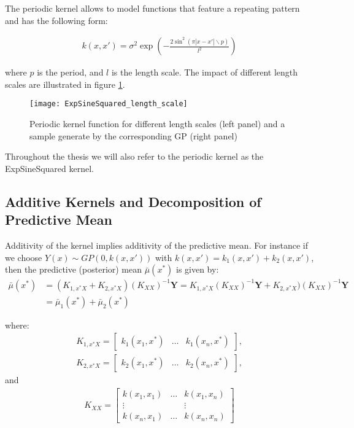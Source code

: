 The periodic kernel allows to model functions that feature a repeating pattern
and has the following form:

\begin{gather*}
k(x, x') = \sigma^2 \exp(- \frac{2 \sin^2(\pi |x-x'| \backslash p)}{l^2})
\end{gather*}

where $p$ is the period, and $l$ is the length scale.
The impact of different length scales are illustrated in figure \ref{fig:periodic}.

\begin{figure}[!hbt]%
  \centering
  \texttt{[image: ExpSineSquared\_length\_scale]} %
  \caption[Periodic Kernel: Kernel function wiht sample path]%
   {Periodic kernel function for different length scales (left panel) and a sample
    generate by the corresponding GP (right panel)}
  \label{fig:periodic}
\end{figure}

Throughout the thesis we will also refer to the periodic kernel as the
ExpSineSquared kernel.


\subsection{Additive Kernels and Decomposition of Predictive Mean}

Additivity of the kernel implies additivity of the predictive mean.
For instance if we choose $Y(x) \sim GP(0, k(x,x'))$ with $k(x,x') = k_1(x, x') + k_2(x,x')$, then
the predictive (posterior) mean $\bar{\mu}(x^{\ast})$
is given by:
\begin{align*}
    \bar{\mu}(x^{\ast}) &= (K_{1, x^{\ast}X} + K_{2, x^{\ast}X}) (K_{XX})^{-1} \mathbf{Y}
    = K_{1, x^{\ast}X} (K_{XX})^{-1} \mathbf{Y} + K_{2, x^{\ast}X}) (K_{XX})^{-1} \mathbf{Y} \\
    &= \bar{\mu}_1(x^{\ast}) + \bar{\mu}_2(x^{\ast})
\end{align*}

where:
\begin{gather*}
    K_{1, x^{\ast}X} =
    \begin{bmatrix}
        k_1(x_1, x^{\ast}) & \dots & k_1(x_n,  x^{\ast})
    \end{bmatrix}, \\
    K_{2, x^{\ast}X} =
    \begin{bmatrix}
        k_2(x_1, x^{\ast}) & \dots & k_2(x_n,  x^{\ast})
    \end{bmatrix},
\end{gather*}
and
\begin{gather*}
        K_{XX} =
    \begin{bmatrix}
        k(x_1, x_1) & \dots & k(x_1, x_n)\\
        \vdots  &  & \vdots \\
        k(x_n, x_1) & \dots  & k(x_n, x_n)
    \end{bmatrix}
\end{gather*}

